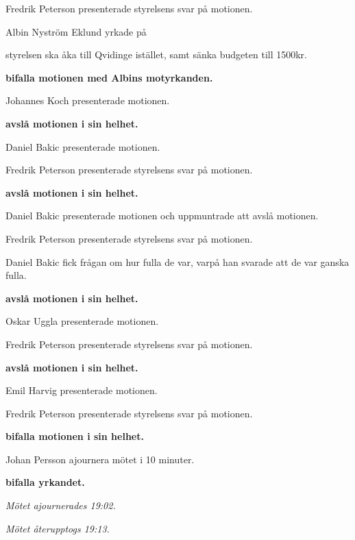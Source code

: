 \documentclass[10pt]{article}
\begin{document}
\begin{paragrafer}
\begin{paragrafer}
        Fredrik Peterson presenterade styrelsens svar på motionen.

        Albin Nyström Eklund yrkade på
        \begin{attsatser}
            \att styrelsen ska åka till Qvidinge istället, samt
            \att sänka budgeten till 1500kr.
        \end{attsatser}

        \textbf{\Mba bifalla motionen med Albins motyrkanden.}

        Johannes Koch presenterade motionen.

        \textbf{\Mba avslå motionen i sin helhet.}

        Daniel Bakic presenterade motionen.

        Fredrik Peterson presenterade styrelsens svar på motionen.

        \textbf{\Mba avslå motionen i sin helhet.}

        Daniel Bakic presenterade motionen och uppmuntrade att avslå motionen.

        Fredrik Peterson presenterade styrelsens svar på motionen.

        Daniel Bakic fick frågan om hur fulla de var, varpå han svarade att de var ganska fulla.

        \textbf{\Mba avslå motionen i sin helhet.}

        Oskar Uggla presenterade motionen.

        Fredrik Peterson presenterade styrelsens svar på motionen.

        \textbf{\Mba avslå motionen i sin helhet.}

        Emil Harvig presenterade motionen.

        Fredrik Peterson presenterade styrelsens svar på motionen.

        \textbf{\Mba bifalla motionen i sin helhet.}

        Johan Persson \ypa ajournera mötet i 10 minuter.

        \textbf{\Mba bifalla yrkandet.}

        \emph{Mötet ajournerades 19:02.}

        \emph{Mötet återupptogs 19:13.}


\end{paragrafer}
\end{paragrafer}
\end{document}
